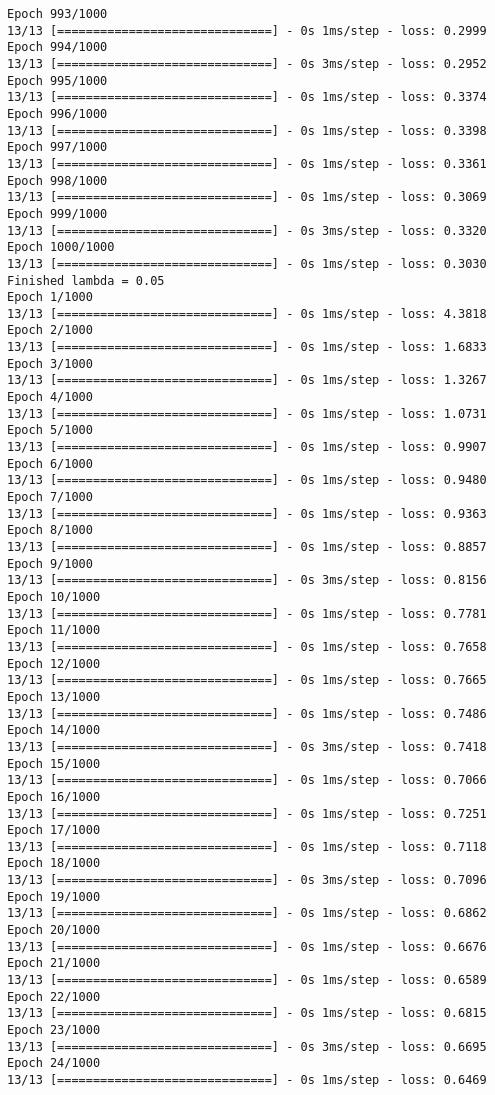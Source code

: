 \documentclass[11pt]{article}
\begin{document}
\begin{Verbatim}[commandchars=\\\{\}]
Epoch 993/1000
13/13 [==============================] - 0s 1ms/step - loss: 0.2999
Epoch 994/1000
13/13 [==============================] - 0s 3ms/step - loss: 0.2952
Epoch 995/1000
13/13 [==============================] - 0s 1ms/step - loss: 0.3374
Epoch 996/1000
13/13 [==============================] - 0s 1ms/step - loss: 0.3398
Epoch 997/1000
13/13 [==============================] - 0s 1ms/step - loss: 0.3361
Epoch 998/1000
13/13 [==============================] - 0s 1ms/step - loss: 0.3069
Epoch 999/1000
13/13 [==============================] - 0s 3ms/step - loss: 0.3320
Epoch 1000/1000
13/13 [==============================] - 0s 1ms/step - loss: 0.3030
Finished lambda = 0.05
Epoch 1/1000
13/13 [==============================] - 0s 1ms/step - loss: 4.3818
Epoch 2/1000
13/13 [==============================] - 0s 1ms/step - loss: 1.6833
Epoch 3/1000
13/13 [==============================] - 0s 1ms/step - loss: 1.3267
Epoch 4/1000
13/13 [==============================] - 0s 1ms/step - loss: 1.0731
Epoch 5/1000
13/13 [==============================] - 0s 1ms/step - loss: 0.9907
Epoch 6/1000
13/13 [==============================] - 0s 1ms/step - loss: 0.9480
Epoch 7/1000
13/13 [==============================] - 0s 1ms/step - loss: 0.9363
Epoch 8/1000
13/13 [==============================] - 0s 1ms/step - loss: 0.8857
Epoch 9/1000
13/13 [==============================] - 0s 3ms/step - loss: 0.8156
Epoch 10/1000
13/13 [==============================] - 0s 1ms/step - loss: 0.7781
Epoch 11/1000
13/13 [==============================] - 0s 1ms/step - loss: 0.7658
Epoch 12/1000
13/13 [==============================] - 0s 1ms/step - loss: 0.7665
Epoch 13/1000
13/13 [==============================] - 0s 1ms/step - loss: 0.7486
Epoch 14/1000
13/13 [==============================] - 0s 3ms/step - loss: 0.7418
Epoch 15/1000
13/13 [==============================] - 0s 1ms/step - loss: 0.7066
Epoch 16/1000
13/13 [==============================] - 0s 1ms/step - loss: 0.7251
Epoch 17/1000
13/13 [==============================] - 0s 1ms/step - loss: 0.7118
Epoch 18/1000
13/13 [==============================] - 0s 3ms/step - loss: 0.7096
Epoch 19/1000
13/13 [==============================] - 0s 1ms/step - loss: 0.6862
Epoch 20/1000
13/13 [==============================] - 0s 1ms/step - loss: 0.6676
Epoch 21/1000
13/13 [==============================] - 0s 1ms/step - loss: 0.6589
Epoch 22/1000
13/13 [==============================] - 0s 1ms/step - loss: 0.6815
Epoch 23/1000
13/13 [==============================] - 0s 3ms/step - loss: 0.6695
Epoch 24/1000
13/13 [==============================] - 0s 1ms/step - loss: 0.6469

\end{Verbatim}
\end{document}
